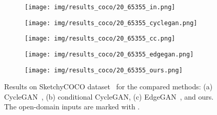 \documentclass[10pt,twocolumn,letterpaper]{article}
\begin{document}
\begin{figure}[tbp]
\begin{center}
  \begin{subfigure}[b]{\cocowidth\linewidth}
  \texttt{[image: img/results\_coco/20\_65355\_in.png]}
  \end{subfigure}
  \begin{subfigure}[b]{\cocowidth\linewidth}
  \texttt{[image: img/results\_coco/20\_65355\_cyclegan.png]}
  \end{subfigure}
 \begin{subfigure}[b]{\cocowidth\linewidth}
  \texttt{[image: img/results\_coco/20\_65355\_cc.png]}
  \end{subfigure}
\begin{subfigure}[b]{\cocowidth\linewidth}
  \texttt{[image: img/results\_coco/20\_65355\_edgegan.png]}
  \end{subfigure}
  \begin{subfigure}[b]{\cocowidth\linewidth}
  \texttt{[image: img/results\_coco/20\_65355\_ours.png]}
  \end{subfigure}
\end{center}
\caption{Results on SketchyCOCO dataset~\cite{gao2020sketchycoco} for the compared methods: (a) CycleGAN~\cite{zhu2017unpaired}, (b) conditional CycleGAN, (c) EdgeGAN~\cite{gao2020sketchycoco}, and ours. The open-domain inputs are marked with \textcolor{blue}{}. }\label{fig:sketchycoco_results}
\end{figure}
\end{document}
